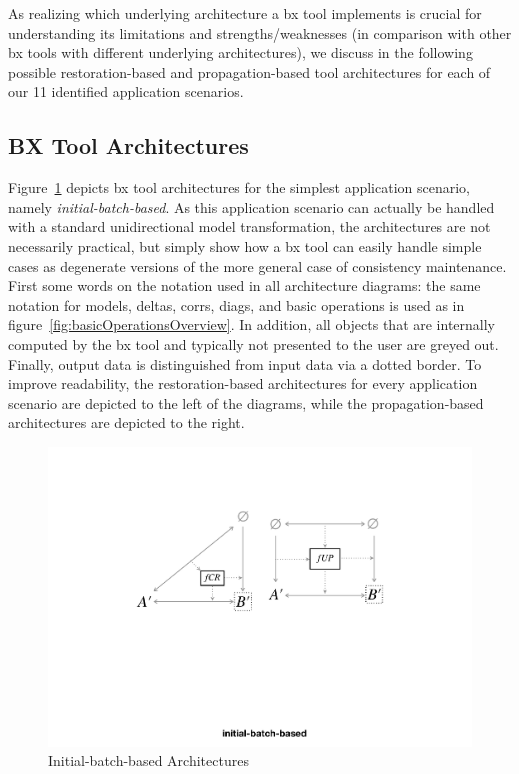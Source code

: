 As realizing which underlying architecture a bx tool implements is crucial for understanding its limitations and strengths/weaknesses (in comparison with other bx tools with different underlying architectures), we discuss in the following possible restoration-based and propagation-based tool architectures for each of our 11 identified application scenarios. 

\subsection{BX Tool Architectures}
\label{sec:bx-tool-architectures}

Figure~\ref{fig:initialBatchBased} depicts bx tool architectures for the simplest application scenario, namely \emph{initial-batch-based}.
As this application scenario can actually be handled with a standard unidirectional model transformation, the architectures are not necessarily practical, but simply show how a bx tool can easily handle simple cases as degenerate versions of the more general case of consistency maintenance.
First some words on the notation used in all architecture diagrams: the same notation for models, deltas, corrs, diags, and basic operations is used as in figure~\ref{fig:basicOperationsOverview}.
In addition, all objects that are internally computed by the bx tool and typically not presented to the user are greyed out.
Finally, output data is distinguished from input data via a dotted border.
To improve readability, the restoration-based architectures for every application scenario are depicted to the left of the diagrams, while the propagation-based architectures are depicted to the right.
%
\begin{figure}[tb!]
	\centering
	\includegraphics[width=0.8\columnwidth]{diagrams/foundations//initial-batch-based}
	\caption{Initial-batch-based Architectures}
	\label{fig:initialBatchBased}
\end{figure}

